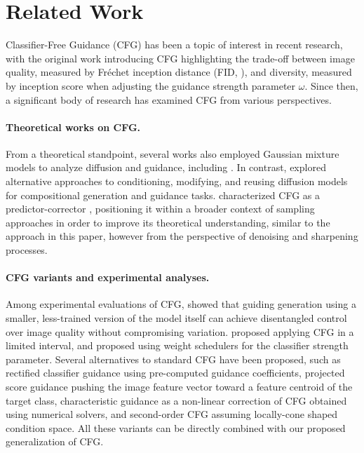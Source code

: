 \section{Related Work}
Classifier-Free Guidance (CFG) has been a topic of interest in recent research, with the original work introducing CFG \citep{ho2022classifier} highlighting the trade-off between image quality, measured by Fréchet inception distance (FID, \citet{heusel2017gans}), and diversity, measured by inception score \citep{salimans2016improved} when adjusting the guidance strength parameter $\omega$. Since then, a significant body of research has examined CFG from various perspectives.

\paragraph{Theoretical works on CFG.} From a theoretical standpoint, several works also employed Gaussian mixture models to analyze diffusion and guidance, including \citet{chidambaram2024does, shah2023learning, liang2024unraveling, cui2023analysis, bai2024expectation}. In contrast, \citet{du2023reduce} explored alternative approaches to conditioning, modifying, and reusing diffusion models for compositional generation and guidance tasks. \citet{bradley2024classifier} characterized CFG as a predictor-corrector \citep{song2020score}, positioning it within a broader context of sampling approaches in order to improve its theoretical understanding, similar to the approach in this paper, however from the perspective of denoising and sharpening processes.


\paragraph{CFG variants and experimental analyses.} Among experimental evaluations of CFG, \citet{karras2024guiding} showed that guiding generation using a smaller, less-trained version of the model itself can achieve disentangled control over image quality without compromising variation. \citet{kynkaanniemi2024applying} proposed applying CFG in a limited interval, and \citet{wang2024analysis} proposed using weight schedulers for the classifier strength parameter. Several alternatives to standard CFG have been proposed, such as rectified classifier guidance \citep{xia2024rectified} using pre-computed guidance coefficients, projected score guidance \citep{kadkhodaie2024feature} pushing the image feature vector toward a feature centroid of the target class, characteristic guidance \citep{zheng2023characteristic} as a non-linear correction of CFG obtained using numerical solvers, and second-order CFG \citep{sun2023inner} assuming locally-cone shaped condition space. All these variants can be directly combined with our proposed generalization of CFG.


